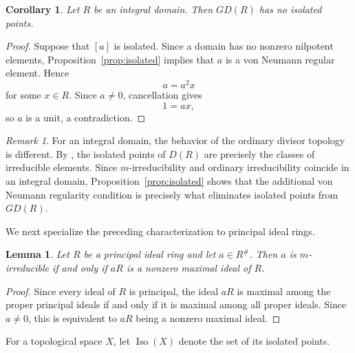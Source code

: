 \documentclass[11pt]{amsart}
\theoremstyle{plain}
\newtheorem{corollary}[theorem]{Corollary}
\newtheorem{lemma}[theorem]{Lemma}
\theoremstyle{definition}
\theoremstyle{remark}
\newtheorem{remark}[theorem]{Remark}
\numberwithin{equation}{section}
\begin{document}
\begin{corollary}\label{cor:no-isolated-domain}
	Let $R$ be an integral domain. Then $GD(R)$ has no isolated points.
\end{corollary}

\begin{proof}
	Suppose that $[a]$ is isolated. Since a domain has no nonzero nilpotent
	elements, Proposition~\ref{prop:isolated} implies that $a$ is a
	von Neumann regular element. Hence
	\[
	a=a^2x
	\]
	for some $x\in R$. Since $a\neq0$, cancellation gives
	\[
	1=ax,
	\]
	so $a$ is a unit, a contradiction.
\end{proof}

\begin{remark}
	For an integral domain, the behavior of the ordinary divisor topology is
	different. By \cite[Proposition 3]{YigitKoc}, the isolated points of
	$D(R)$ are precisely the classes of irreducible elements. Since
	$m$-irreducibility and ordinary irreducibility coincide in an integral
	domain, Proposition~\ref{prop:isolated} shows that the additional
	von Neumann regularity condition is precisely what eliminates isolated
	points from $GD(R)$.
\end{remark}


We next specialize the preceding characterization to principal ideal
rings.

\begin{lemma}\label{lem:m-irred-pir}
	Let $R$ be a principal ideal ring and let $a\in R^\#$. Then $a$ is
	$m$-irreducible if and only if $aR$ is a nonzero maximal ideal of $R$.
\end{lemma}

\begin{proof}
	Since every ideal of $R$ is principal, the ideal $aR$ is maximal among
	the proper principal ideals if and only if it is maximal among all proper
	ideals. Since $a\neq0$, this is equivalent to $aR$ being a nonzero
	maximal ideal.
\end{proof}


For a topological space $X$, let $\operatorname{Iso}(X)$ denote the set
of its isolated points.
\end{document}
